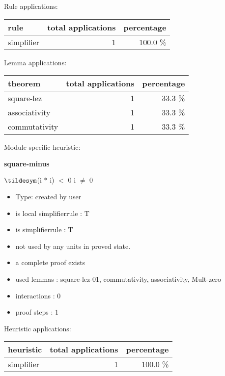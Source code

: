 \documentclass[a4paper]{article}
\begin{document}
Rule applications:

\begin{supertabular}{l|r|r}
rule	        & total applications & percentage \\ \hline
simplifier & 1 & 100.0 \% \\

\end{supertabular}

Lemma applications:

\begin{supertabular}{l|r|r}
theorem	        & total applications & percentage \\ \hline
square-lez & 1 & 33.3 \% \\
associativity & 1 & 33.3 \% \\
commutativity & 1 & 33.3 \% \\

\end{supertabular}

Module specific heuristic:

\pagebreak

{\LARGE\bf square-minus}\label{lemma-square-minus}

\medskip

 \Fol $\tildesym$(i $*$ i) $<$ 0 \Equiv i $\neq$ 0

\begin{itemize}

\item Type: created by user

\item is local simplifierrule : T
\item is simplifierrule : T
\item not used by any units in proved state.
\item       a complete proof exists
\item       used lemmas  : square-lez-01, commutativity, associativity, Mult-zero
\item       interactions : 0
\item       proof steps  : 1
\end{itemize}

\medskip


Heuristic applications:

\begin{supertabular}{l|r|r}
heuristic	& total applications & percentage \\ \hline
simplifier & 1 & 100.0 \% \\

\end{supertabular}
\end{document}
